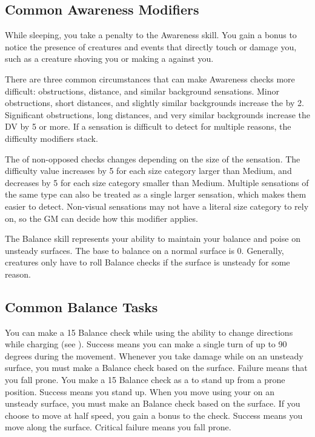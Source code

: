     \subsection{Common Awareness Modifiers}\label{Common Awareness Modifiers}
        While sleeping, you take a  penalty to the Awareness skill.
        You gain a  bonus to notice the presence of creatures and events that directly touch or damage you, such as a creature shoving you or making a  against you.

        There are three common circumstances that can make Awareness checks more difficult: obstructions, distance, and similar background sensations.
        Minor obstructions, short distances, and slightly similar backgrounds increase the  by 2.
        Significant obstructions, long distances, and very similar backgrounds increase the DV by 5 or more.
        If a sensation is difficult to detect for multiple reasons, the difficulty modifiers stack.

        The  of non-opposed checks changes depending on the size of the sensation.
        The difficulty value increases by 5 for each size category larger than Medium, and decreases by 5 for each size category smaller than Medium.
        Multiple sensations of the same type can also be treated as a single larger sensation, which makes them easier to detect.
        Non-visual sensations may not have a literal size category to rely on, so the GM can decide how this modifier applies.

\newpage
{}
    The Balance skill represents your ability to maintain your balance and poise on unsteady surfaces.
    The base  to balance on a normal surface is 0.
    Generally, creatures only have to roll Balance checks if the surface is unsteady for some reason.

    \subsection{Common Balance Tasks}
        \label{Agile Charge} You can make a  15 Balance check while using the  ability to change directions while charging (see ).
        Success means you can make a single turn of up to 90 degrees during the movement.
         Whenever you take damage while on an unsteady surface, you must make a Balance check based on the surface.
        Failure means that you fall prone.
        \label{Rapid Stand} You make a  15 Balance check as a  to stand up from a prone position.
        Success means you stand up.
         When you move using your  on an unsteady surface, you must make an Balance check based on the surface.
        If you choose to move at half speed, you gain a  bonus to the check.
        Success means you move along the surface.
        Critical failure means you fall prone.

